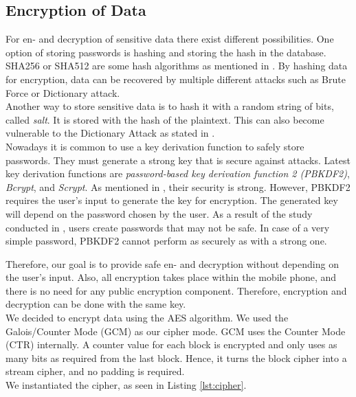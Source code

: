 \subsection{Encryption of Data}\label{arch_encryption}
For en- and decryption of sensitive data there exist different possibilities. One option of storing passwords is hashing and storing the hash in the database. SHA256 or SHA512 are some hash algorithms as mentioned in \cite{ertaul2016implementation}. By hashing data for encryption, data can be recovered by multiple different attacks such as Brute Force or Dictionary attack. \\
Another way to store sensitive data is to hash it with a random string of bits, called \textit{salt}. It is stored with the hash of the plaintext. This can also become vulnerable to the Dictionary Attack as stated in \cite{3wrongways}. \\
Nowadays it is common to use a key derivation function to safely store passwords. They must generate a strong key that is secure against attacks. Latest key derivation functions are \textit{password-based key derivation function 2 (PBKDF2)}, \textit{Bcrypt}, and \textit{Scrypt}. As mentioned in \cite{ertaul2016implementation}, their security is strong.
However, PBKDF2 requires the user's input to generate the key for encryption. The generated key will depend on the password chosen by the user. \cite{Agilebits} As a result of the study conducted in \cite{DBLP:journals/ieeesp/YanBAG04}, users create passwords that may not be safe. In case of a very simple password, PBKDF2 cannot perform as securely as with a strong one. \cite{3wrongways}

Therefore, our goal is to provide safe en- and decryption without depending on the user's input. Also, all encryption takes place within the mobile phone, and there is no need for any public encryption component. Therefore, encryption and decryption can be done with the same key. \cite{DBLP:journals/ijnsec/ElminaamKH10} \\
We decided to encrypt data using the AES algorithm. We used the Galois/Counter Mode (GCM) as our cipher mode. GCM uses the Counter Mode (CTR) internally. \cite{AESJavaAndroid} A counter value for each block is encrypted and only uses as many bits as required from the last block. Hence, it turns the block cipher into a stream cipher, and no padding is required. \cite{IVtransmission} \\
We instantiated the cipher, as seen in Listing \ref{lst:cipher}.

